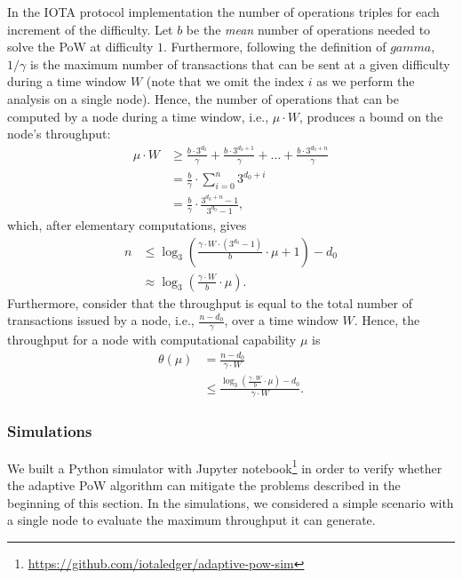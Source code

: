 \documentclass[../main.tex]{subfiles}
\begin{document}
In the IOTA protocol implementation the number of operations triples for each increment of the difficulty. Let $b$ be the \textit{mean} number of operations needed to solve the PoW at difficulty $1$. Furthermore, following the definition of $gamma$, $1/\gamma$ is the maximum number of transactions that can be sent at a given difficulty during a time window $W$ (note that we omit the index $i$ as we perform the analysis on a single node). Hence, the number of operations that can be computed by a node during a time window, i.e., $\mu\cdot W$, produces a bound on the node's throughput:
    \begin{align*}
        \mu\cdot W &\geq \frac{b\cdot 3^{d_0}}{\gamma} + \frac{b\cdot 3^{d_0+1}}{\gamma} + \ldots + \frac{b\cdot 3^{d_0+n}}{\gamma}\\
        &= \frac{b}{\gamma}\cdot\sum_{i=0}^n3^{d_0+i}\\
        &= \frac{b}{\gamma}\cdot\frac{3^{d_0+n}-1}{3^{d_0}-1},
    \end{align*}
    which, after elementary computations, gives
    \begin{align}\label{eq:n-bound}
        n &\leq\log_3\left(\frac{\gamma\cdot W\cdot(3^{d_0}-1)}{b}\cdot\mu+1\right) - d_0\nonumber\\
        &\approx \log_3\left(\frac{\gamma\cdot W}{b}\cdot\mu\right).
    \end{align}
    Furthermore, consider that the throughput is equal to the total number of transactions issued by a node, i.e., $\frac{n-d_0}{\gamma}$, over a time window $W$. Hence, the throughput for a node with computational capability $\mu$ is
    \begin{align*}
        \theta(\mu)&=\frac{n-d_0}{\gamma\cdot W}\\
        &\leq \frac{\log_3\left(\frac{\gamma\cdot W}{b}\cdot\mu\right) - d_0}{\gamma\cdot W}.    \end{align*}


\subsubsection{Simulations}

We built a Python simulator with Jupyter notebook\footnote{\url{https://github.com/iotaledger/adaptive-pow-sim}} in order to verify whether the adaptive PoW algorithm can mitigate the problems described in the beginning of this section. In the simulations, we considered a simple scenario with a single node to evaluate the maximum throughput it can generate.
\end{document}
